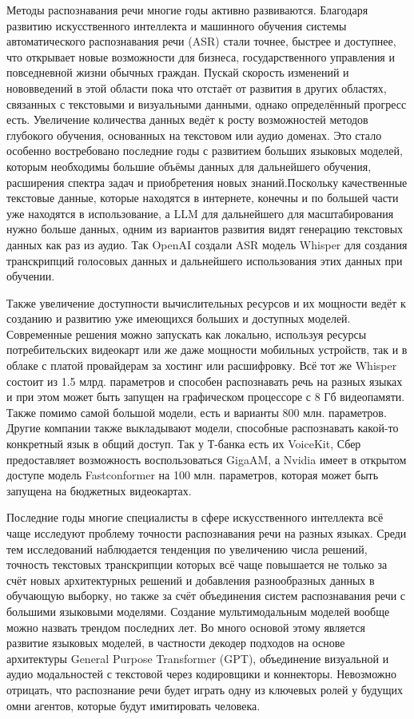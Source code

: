 Методы распознавания речи многие годы активно развиваются.
Благодаря развитию искусственного интеллекта и машинного обучения системы автоматического распознавания речи (ASR) стали точнее, быстрее и доступнее, что открывает новые возможности для бизнеса, государственного управления и повседневной жизни обычных граждан.
Пускай скорость изменений и нововведений в этой области пока что отстаёт от развития в других областях, связанных с текстовыми и визуальными данными, однако определённый прогресс есть.
Увеличение количества данных ведёт к росту возможностей методов глубокого обучения, основанных на текстовом или аудио доменах.
Это стало особенно востребовано последние годы с развитием больших языковых моделей, которым необходимы большие объёмы данных для дальнейшего обучения, расширения спектра задач и приобретения новых знаний.Поскольку качественные текстовые данные, которые находятся в интернете, конечны и по большей части уже находятся в использование, а LLM для дальнейшего для масштабирования нужно больше данных, одним из вариантов развития видят генерацию текстовых данных как раз из аудио.
Так OpenAI создали ASR модель Whisper для создания транскрипций голосовых данных и дальнейшего использования этих данных при обучении.

Также увеличение доступности вычислительных ресурсов и их мощности ведёт к созданию и развитию уже имеющихся больших и доступных моделей.
Современные решения можно запускать как локально, используя ресурсы потребительских видеокарт или же даже мощности мобильных устройств, так и в облаке с платой провайдерам за хостинг или расшифровку.
Всё тот же Whisper состоит из 1.5 млрд. параметров и способен распознавать речь на разных языках и при этом может быть запущен на графическом процессоре с 8 Гб видеопамяти.
Также помимо самой большой модели, есть и варианты 800 млн. параметров.
Другие компании также выкладывают модели, способные распознавать какой-то конкретный язык в общий доступ.
Так у Т-банка есть их VoiceKit, Сбер предоставляет возможность воспользоваться GigaAM, а Nvidia имеет в открытом доступе модель Fastconformer на 100 млн. параметров, которая может быть запущена на бюджетных видеокартах.

Последние годы многие специалисты в сфере искусственного интеллекта всё чаще исследуют проблему точности распознавания речи на разных языках.
Среди тем исследований наблюдается тенденция по увеличению числа решений, точность текстовых транскрипции которых всё чаще повышается не только за счёт новых архитектурных решений и добавления разнообразных данных в обучающую выборку, но также за счёт объединения систем распознавания речи с большими языковыми моделями.
Создание мультимодальным моделей вообще можно назвать трендом последних лет.
Во много основой этому является развитие языковых моделей, в частности декодер подходов на основе архитектуры General Purpose Transformer (GPT), объединение визуальной и аудио модальностей с текстовой через кодировщики и коннекторы.
Невозможно отрицать, что распознание речи будет играть одну из ключевых ролей у будущих омни агентов, которые будут имитировать человека.

